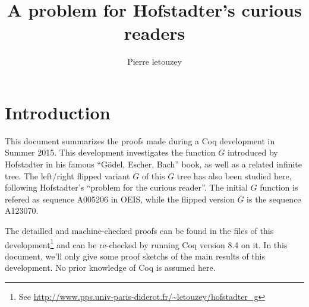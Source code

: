 \documentclass[a4paper,11pt]{article}
\title{A problem for Hofstadter's curious readers}
\author{Pierre letouzey}
\begin{document}
\newtheorem{theorem}{Theorem}
\newtheorem{definition}{Definition}
\maketitle

\newcommand{\FG}{\ensuremath{\overline{G}}}
\newcommand{\fibrest}{\ensuremath{\Sigma F_i}}

\section{Introduction}
This document summarizes the proofs made during a Coq development in
Summer 2015. This development investigates the function $G$ introduced
by Hofstadter in his famous ``Gödel, Escher, Bach'' book\cite{??}, as
well as a related infinite tree. The left/right flipped variant
$\FG$ of this $G$ tree has also been studied here, following
Hofstadter's ``problem for the curious reader''.
The initial $G$ function is refered as sequence A005206 in
OEIS\cite{??}, while the flipped version $\FG$ is the sequence
A123070.

The detailled and machine-checked proofs can be found in the files
of this development\footnote{See
\url{http://www.pps.univ-paris-diderot.fr/~letouzey/hofstadter_g}}
and can be re-checked by running Coq version 8.4 \cite{??} on it.
In this document, we'll only give some proof sketchs of the
main results of this development. No prior knowledge of Coq is assumed
here.
\end{document}
